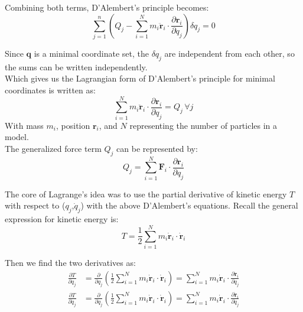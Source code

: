 \documentclass[titlepage]{article}
\begin{document}
Combining both terms, D'Alembert's principle becomes:
\begin{equation}
	\sum_{j=1}^{n}\left(Q_j-\sum_{i=1}^{N}m_i\ddot{\boldsymbol{r}}_i\cdot\frac{\partial\boldsymbol{r}_i}{\partial q_j}\right)\delta q_j=0
\end{equation}

Since $\boldsymbol{q}$ is a minimal coordinate set, the $\delta q_j$ are independent from each other, so the sums can be written independently.\\

Which gives us the Lagrangian form of D'Alembert's principle for minimal coordinates is written as:
\begin{equation}
	\sum_{i=1}^{N}m_i\ddot{\boldsymbol{r}}_i\cdot\frac{\partial\boldsymbol{r}_i}{\partial q_j}=Q_j\,\forall j
	\label{eq:dalembert}
\end{equation}
With mass $m_i$, position $\boldsymbol{r}_i$, and $N$ representing the number of particles in a model.\\

The generalized force term $Q_j$ can be represented by:
\begin{equation}
	Q_j=\sum_{i=1}^{N}\boldsymbol{F}_i\cdot\frac{\partial\boldsymbol{r}_i}{\partial q_j}
	\label{eq:genforce}
\end{equation}

The core of Lagrange's idea was to use the partial derivative of kinetic energy $T$ with respect to ($q_j$,$\dot{q}_j$) with the above D'Alembert's equations. Recall the general expression for kinetic energy is:
\begin{equation}
	T=\frac{1}{2}\sum_{i=1}^{N}m_i\dot{\boldsymbol{r}}_i\cdot\dot{\boldsymbol{r}}_i
\end{equation}

Then we find the two derivatives as:
\begin{equation}
	\begin{split}
		\frac{\partial T}{\partial q_j}&=\frac{\partial}{\partial q_j}\left(\frac{1}{2}\sum_{i=1}^{N}m_i\dot{\boldsymbol{r}}_i\cdot\dot{\boldsymbol{r}}_i\right)=\sum_{i=1}^{N}m_i\dot{\boldsymbol{r}}_i\cdot\frac{\partial\dot{\boldsymbol{r}}_i}{\partial q_j} \\
		\frac{\partial T}{\partial\dot{q}_j}&=\frac{\partial}{\partial\dot{q}_j}\left(\frac{1}{2}\sum_{i=1}^{N}m_i\dot{\boldsymbol{r}}_i\cdot\dot{\boldsymbol{r}}_i\right)=\sum_{i=1}^{N}m_i\dot{\boldsymbol{r}}_i\cdot\frac{\partial\dot{\boldsymbol{r}}_i}{\partial\dot{q}_j}
	\end{split}
	\label{eq:energyderivative}
\end{equation}
\end{document}

